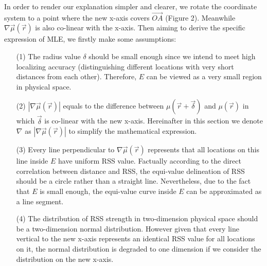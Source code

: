 \documentclass[10pt,conference,compsocconf,letterpaper]{IEEEtran}
\begin{document}
In order to render our explanation simpler and clearer, we rotate the coordinate system to a point where the new x-axis covers $\overrightarrow{OA}$ (Figure 2). Meanwhile $\nabla \vec \mu (\vec r)$ is also co-linear with the x-axis. Then aiming to derive the specific expression of MLE, we firstly make some assumptions:
\begin{itemize}
\item[(1)] The radius value $\delta$ should be small enough since we intend to meet high localizing accuracy (distinguishing different locations with very short distances from each other). Therefore, $E$ can be viewed as a very small region in physical space.
\item[(2)] $\left| {\nabla \vec \mu (\vec r)} \right|$ equals to the difference between $\mu (\vec r + \vec \delta )$ and $\mu (\vec r)$ in which $\vec \delta $ is co-linear with the new x-axis. Hereinafter in this section we denote $\nabla$ as $\left| {\nabla \vec \mu (\vec r)} \right|$ to simplify the mathematical expression.
\item[(3)] Every line perpendicular to $\nabla \vec \mu (\vec r)$ represents that all locations on this line inside $E$ have uniform RSS value. Factually according to the direct correlation between distance and RSS, the equi-value delineation of RSS should be a circle rather than a straight line. Nevertheless, due to the fact that $E$ is small enough, the equi-value curve inside $E$ can be approximated as a line segment.
\item[(4)] The distribution of RSS strength in two-dimension physical space should be a two-dimension normal distribution. However given that every line vertical to the new x-axis represents an identical RSS value for all locations on it, the normal distribution is degraded to one dimension if we consider the distribution on the new x-axis.
\end{itemize}
\end{document}
